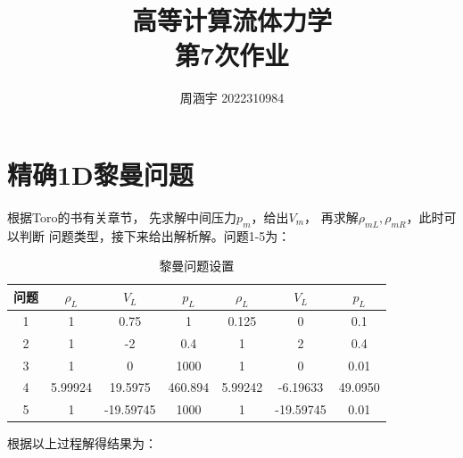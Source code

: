 \documentclass[UTF8,zihao=5]{ctexart} %
\title{{\bfseries\rmfamily\Huge{高等计算流体力学\hspace{1em}\\第7次作业}}}
\author{周涵宇 2022310984}
\date{}
\begin{document}
\maketitle

\section{精确1D黎曼问题}

根据Toro的书\cite{2013Riemann}有关章节，
先求解中间压力$p_m$，给出$V_m$，
再求解$\rho_{mL},\rho_{mR}$，此时可以判断
问题类型，接下来给出解析解。问题1-5为：

\begin{table}[H]
    \begin{center}
        \caption{黎曼问题设置}
        \begin{tabular}{|c|c|c|c|c|c|c|}
            \hline
            问题 & $\rho_L$ & $V_L$     & $p_L$   & $\rho_L$ & $V_L$     & $p_L$   \\
            \hline
            1    & 1        & 0.75      & 1       & 0.125    & 0         & 0.1     \\
            \hline
            2    & 1        & -2        & 0.4     & 1        & 2         & 0.4     \\
            \hline
            3    & 1        & 0         & 1000    & 1        & 0         & 0.01    \\
            \hline
            4    & 5.99924  & 19.5975   & 460.894 & 5.99242  & -6.19633  & 49.0950 \\
            \hline
            5    & 1        & -19.59745 & 1000    & 1        & -19.59745 & 0.01    \\
            \hline
        \end{tabular}
    \end{center}
\end{table}

根据以上过程解得结果为：
\end{document}
